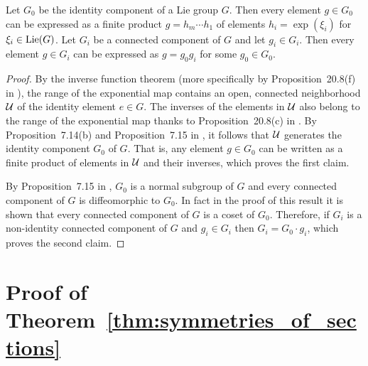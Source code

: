 \documentclass[twoside,11pt]{article}
\begin{document}
    \begin{lemma}
        \label{lem:generation_by_finite_products}
        Let $G_0$ be the identity component of a Lie group $G$.
        Then every element $g\in G_0$ can be expressed as a finite product $g = h_m \cdots h_1$ of elements $h_i=\exp(\xi_i)$ for $\xi_i \in\operatorname{Lie}(G)$.
        Let $G_i$ be a connected component of $G$ and let $g_i \in G_i$.
        Then every element $g\in G_i$ can be expressed as $g = g_0 g_i$ for some $g_0 \in G_0$.
    \end{lemma}
    \begin{proof}
        By the inverse function theorem (more specifically by Proposition~20.8(f) in \cite{Lee2013introduction}), the range of the exponential map contains an open, connected neighborhood ${\mathcal{U}}$ of the identity element $e \in G$.
        The inverses of the elements in ${\mathcal{U}}$ also belong to the range of the exponential map thanks to Proposition~20.8(c) in \cite{Lee2013introduction}.
        By Proposition~7.14(b) and Proposition~7.15 in \cite{Lee2013introduction}, it follows that ${\mathcal{U}}$ generates the identity component $G_0$ of $G$.
        That is, any element $g\in G_0$ can be written as a finite product of elements in ${\mathcal{U}}$ and their inverses, which proves the first claim.
        
        By Proposition~7.15 in \cite{Lee2013introduction}, $G_0$ is a normal subgroup of $G$ and every connected component of $G$ is diffeomorphic to $G_0$.
        In fact in the proof of this result it is shown that every connected component of $G$ is a coset of $G_0$.
        Therefore, if $G_i$ is a non-identity connected component of $G$ and $g_i \in G_i$ then $G_i = G_0 \cdot g_i$, which proves the second claim.
    \end{proof}

\section{Proof of Theorem~\ref{thm:symmetries_of_sections}}
\label{app:symmetries_of_sections}
\end{document}
